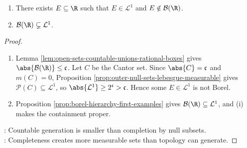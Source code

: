 \begin{theorem} \label{thm:lebesgue-measurable-non-borel-sets-exist} 
\begin{enumerate}[label=(\roman*)]
\setlength{\itemsep}{0pt}
\item There exists $E\subseteq\R$ such that $E\in\mathcal{L}^1$ and $E\notin\mathcal{B}(\R)$.
\item $\mathcal{B}(\R)\subsetneq\mathcal{L}^1$.
\end{enumerate}
\begin{proof}
\begin{enumerate}[label=(\roman*)]
\setlength{\itemsep}{0pt}
\item Lemma \ref{lem:open-sets-countable-unions-rational-boxes} gives $\abs{\mathcal{B}(\R)}\leq\mathfrak{c}$. Let $C$ be the Cantor set. Since $\abs{C}=\mathfrak{c}$ and $m(C)=0$, Proposition \ref{prop:outer-null-sets-lebesgue-measurable} gives $\mathcal{P}(C)\subseteq\mathcal{L}^1$, so $\abs{\mathcal{L}^1}\geq2^{\mathfrak{c}}>\mathfrak{c}$. Hence some $E\in\mathcal{L}^1$ is not Borel.
\item Proposition \ref{prop:borel-hierarchy-first-examples} gives $\mathcal{B}(\R)\subseteq\mathcal{L}^1$, and (i) makes the containment proper.
\end{enumerate}
: Countable generation is smaller than completion by null subsets.\\
: Completeness creates more measurable sets than topology can generate.
\end{proof}
\end{theorem}
